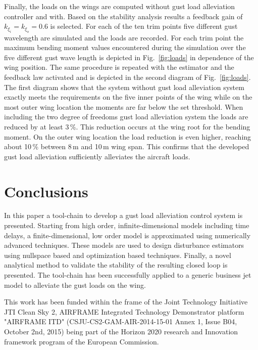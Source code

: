 \documentclass[graybox]{svmult}
\begin{document}
Finally, the loads on the wings are computed without gust load alleviation controller and with.  Based on the stability analysis results a feedback gain of $k_{\xi_i}=k_{\xi_o}=0.6$ is selected. For each of the ten trim points five different gust wavelength are simulated and the loads are recorded. For each trim point the maximum bending moment values  encountered during the simulation over the five different gust wave length is depicted in Fig.~\ref{fig:loads} in dependence of the wing position. The same procedure is repeated with the estimator and the feedback law activated and is depicted in the second diagram of Fig.~\ref{fig:loads}. The first diagram shows that the system without gust load alleviation system exactly meets the requirements on the five inner  points of the wing while on the most outer wing location the moments are far below the set threshold. When including the two degree of freedoms gust load alleviation system the loads are reduced by at least 3\,\%. This reduction occurs at the wing root for the bending moment. On the outer wing location the load reduction is even higher, reaching about 10\,\% between 8\,m and 10\,m wing span.
This confirms that the developed gust load alleviation sufficiently alleviates the aircraft loads.\vspace{-1mm}

\section{Conclusions}\vspace{-1mm}
In this paper a tool-chain to develop a gust load alleviation control system is presented. Starting from high order, infinite-dimensional models including time delays, a finite-dimensional, low order model is approximated using numerically advanced techniques. These models are used to design  disturbance estimators using nullspace based and optimization based techniques. Finally, a novel analytical method to validate the stability of the resulting closed loop is presented. The tool-chain has been successfully applied to a generic business jet model to alleviate the gust loads on the wing. 

\vspace{-2mm}
\begin{acknowledgement}
This work has been funded within the frame of the Joint Technology Initiative JTI Clean Sky 2, AIRFRAME Integrated Technology Demonstrator platform "AIRFRAME ITD" (CSJU-CS2-GAM-AIR-2014-15-01 Annex 1, Issue B04, October 2nd, 2015) being part of the Horizon 2020 research and Innovation framework program of the European Commission.
\end{acknowledgement}
%

\vspace{-6mm}



%
\end{document}

